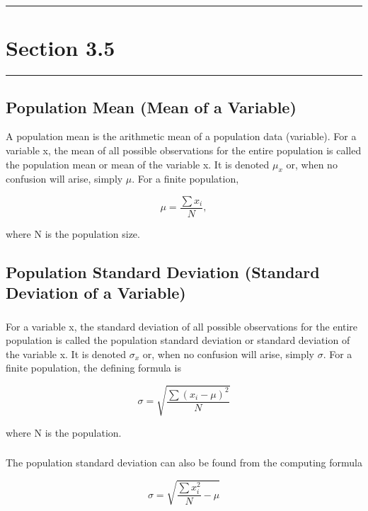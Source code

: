 \documentclass[12pt]{article}
\begin{document}
    \noindent\rule{\textwidth}{0.4pt}
    \section*{Section 3.5}
    \noindent\rule{\textwidth}{0.4pt}
        \subsection*{Population Mean (Mean of a Variable)}
            A population mean is the arithmetic mean of a population data (variable). For a variable x,
            the mean of all possible observations for the entire population is called the population 
            mean or mean of the variable x. It is denoted \(\mu_x\) or, when no confusion will arise,
            simply \(\mu\). For a finite population,
            \begin{center}
                \[
                    \mu = \frac{\sum{x_i}}{N},    
                \]    
            \end{center}
            where N is the population size.
        \subsection*{Population Standard Deviation (Standard Deviation of a Variable)}
            \subsubsection*{}    
                For a variable x, the standard deviation of all possible observations for the entire
                population is called the population standard deviation or standard deviation of the 
                variable x. It is denoted \(\sigma_x\) or, when no confusion will arise, simply \(\sigma\). 
                For a finite population, the defining formula is
                \begin{center}
                    \[
                        \sigma = \sqrt{\frac{\sum(x_i-\mu)^2}{N}}
                    \]                
            \end{center}
                where N is the population.
            \subsubsection*{}
                The population standard deviation can also be found from the computing formula 
                \begin{center}
                    \[
                        \sigma = \sqrt{\frac{\sum x_i^2}{N}-\mu}
                    \]                    
                \end{center}
\end{document}
